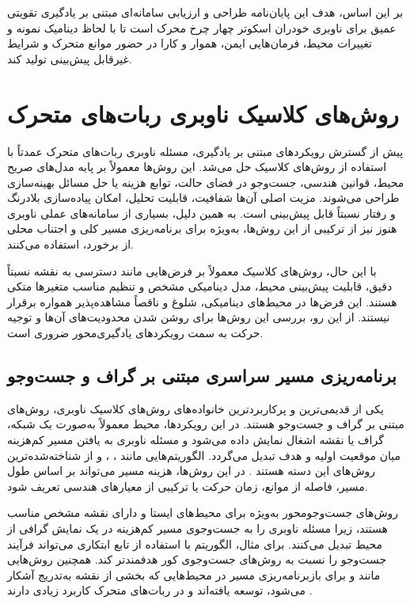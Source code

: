 بر این اساس، هدف این پایان‌نامه طراحی و ارزیابی سامانه‌ای مبتنی بر یادگیری تقویتی عمیق برای ناوبری خودران اسکوتر چهار چرخ محرک است تا با لحاظ دینامیک نمونه و تغییرات محیط، فرمان‌هایی ایمن، هموار و کارا در حضور موانع متحرک و شرایط غیرقابل پیش‌بینی تولید کند.

\section{روش‌های کلاسیک ناوبری ربات‌های متحرک}

پیش از گسترش رویکردهای مبتنی بر یادگیری، مسئله ناوبری ربات‌های متحرک عمدتاً با استفاده از روش‌های کلاسیک حل می‌شد. این روش‌ها معمولاً بر پایه مدل‌های صریح محیط، قوانین هندسی، جست‌وجو در فضای حالت، توابع هزینه یا حل مسائل بهینه‌سازی طراحی می‌شوند. مزیت اصلی آن‌ها شفافیت، قابلیت تحلیل، امکان پیاده‌سازی بلادرنگ و رفتار نسبتاً قابل پیش‌بینی است. به همین دلیل، بسیاری از سامانه‌های عملی ناوبری هنوز نیز از ترکیبی از این روش‌ها، به‌ویژه برای برنامه‌ریزی مسیر کلی و اجتناب محلی از برخورد، استفاده می‌کنند.

با این حال، روش‌های کلاسیک معمولاً بر فرض‌هایی مانند دسترسی به نقشه نسبتاً دقیق، قابلیت پیش‌بینی محیط، مدل دینامیکی مشخص و تنظیم مناسب متغیرها متکی هستند. این فرض‌ها در محیط‌های دینامیکی، شلوغ و ناقصاً مشاهده‌پذیر همواره برقرار نیستند. از این رو، بررسی این روش‌ها برای روشن شدن محدودیت‌های آن‌ها و توجیه حرکت به سمت رویکردهای یادگیری‌محور ضروری است.

\subsection{برنامه‌ریزی مسیر سراسری مبتنی بر گراف و جست‌وجو}

یکی از قدیمی‌ترین و پرکاربردترین خانواده‌های روش‌های کلاسیک ناوبری، روش‌های مبتنی بر گراف و جست‌وجو هستند. در این رویکردها، محیط معمولاً به‌صورت یک شبکه، گراف یا نقشه اشغال نمایش داده می‌شود و مسئله ناوبری به یافتن مسیر کم‌هزینه میان موقعیت اولیه و هدف تبدیل می‌گردد. الگوریتم‌هایی مانند ، ،  و  از شناخته‌شده‌ترین روش‌های این دسته هستند %
\cite{Dijkstra1959,Hart1968AStar,koenig2005dstar}.
در این روش‌ها، هزینه مسیر می‌تواند بر اساس طول مسیر، فاصله از موانع، زمان حرکت یا ترکیبی از معیارهای هندسی تعریف شود.

روش‌های جست‌وجومحور به‌ویژه برای محیط‌های ایستا و دارای نقشه مشخص مناسب هستند، زیرا مسئله ناوبری را به جست‌وجوی مسیر کم‌هزینه در یک نمایش گرافی از محیط تبدیل می‌کنند. برای مثال، الگوریتم  با استفاده از تابع ابتکاری می‌تواند فرآیند جست‌وجو را نسبت به روش‌های جست‌وجوی کور هدفمندتر کند. همچنین روش‌هایی مانند  و  برای بازبرنامه‌ریزی مسیر در محیط‌هایی که بخشی از نقشه به‌تدریج آشکار می‌شود، توسعه یافته‌اند و در ربات‌های متحرک کاربرد زیادی دارند %
\cite{koenig2005dstar,ferguson2008motion_planning}.

